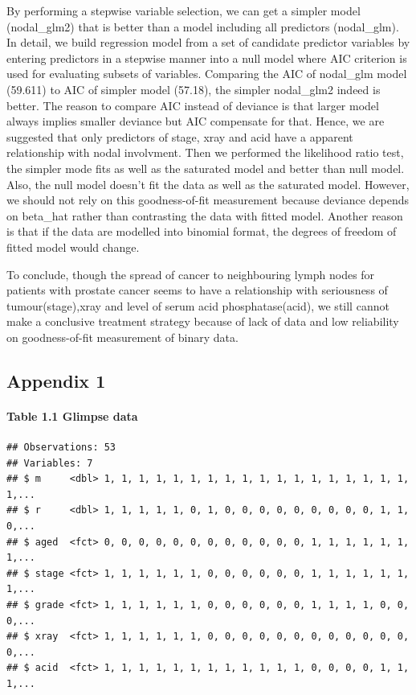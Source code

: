\documentclass[]{article}
\let\oldparagraph\paragraph
\renewcommand{\paragraph}[1]{\oldparagraph{#1}\mbox{}}
\begin{document}
By performing a stepwise variable selection, we can get a simpler model
(nodal\_glm2) that is better than a model including all predictors
(nodal\_glm). In detail, we build regression model from a set of
candidate predictor variables by entering predictors in a stepwise
manner into a null model where AIC criterion is used for evaluating
subsets of variables. Comparing the AIC of nodal\_glm model (59.611) to
AIC of simpler model (57.18), the simpler nodal\_glm2 indeed is better.
The reason to compare AIC instead of deviance is that larger model
always implies smaller deviance but AIC compensate for that. Hence, we
are suggested that only predictors of stage, xray and acid have a
apparent relationship with nodal involvment. Then we performed the
likelihood ratio test, the simpler mode fits as well as the saturated
model and better than null model. Also, the null model doesn't fit the
data as well as the saturated model. However, we should not rely on this
goodness-of-fit measurement because deviance depends on beta\_hat rather
than contrasting the data with fitted model. Another reason is that if
the data are modelled into binomial format, the degrees of freedom of
fitted model would change.

To conclude, though the spread of cancer to neighbouring lymph nodes for
patients with prostate cancer seems to have a relationship with
seriousness of tumour(stage),xray and level of serum acid
phosphatase(acid), we still cannot make a conclusive treatment strategy
because of lack of data and low reliability on goodness-of-fit
measurement of binary data.

\subsection{Appendix 1}\label{appendix-1}

\paragraph{Table 1.1 Glimpse data}\label{table-1.1-glimpse-data}

\begin{verbatim}
## Observations: 53
## Variables: 7
## $ m     <dbl> 1, 1, 1, 1, 1, 1, 1, 1, 1, 1, 1, 1, 1, 1, 1, 1, 1, 1, 1,...
## $ r     <dbl> 1, 1, 1, 1, 1, 0, 1, 0, 0, 0, 0, 0, 0, 0, 0, 0, 1, 1, 0,...
## $ aged  <fct> 0, 0, 0, 0, 0, 0, 0, 0, 0, 0, 0, 0, 1, 1, 1, 1, 1, 1, 1,...
## $ stage <fct> 1, 1, 1, 1, 1, 1, 0, 0, 0, 0, 0, 0, 1, 1, 1, 1, 1, 1, 1,...
## $ grade <fct> 1, 1, 1, 1, 1, 1, 0, 0, 0, 0, 0, 0, 1, 1, 1, 1, 0, 0, 0,...
## $ xray  <fct> 1, 1, 1, 1, 1, 1, 0, 0, 0, 0, 0, 0, 0, 0, 0, 0, 0, 0, 0,...
## $ acid  <fct> 1, 1, 1, 1, 1, 1, 1, 1, 1, 1, 1, 1, 0, 0, 0, 0, 1, 1, 1,...
\end{verbatim}
\end{document}
